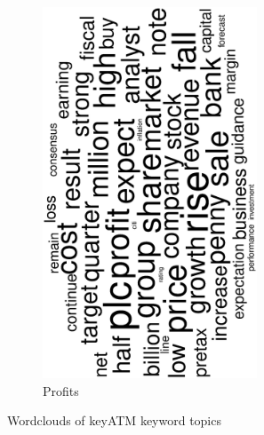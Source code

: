 \begin{figure}
	\begin{subfigure}{0.32\textwidth}
		\includegraphics[width=0.7\textwidth,angle=270]{figures/wordcloud10.eps}
		\caption{Profits}
	\end{subfigure}

	\caption{Wordclouds of \textsf{keyATM} keyword topics}
	\label{fig:wordclouds}
\end{figure}
\newpage

  
  
 
